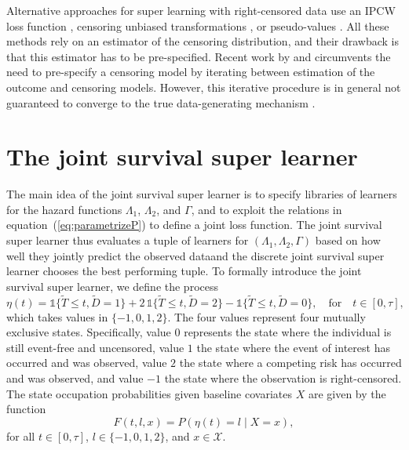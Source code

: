 \documentclass[alpha-refs]{wiley-article}
\newcommand{\1}{\mathbb{1}} %
\providecommand{\DIFaddtex}[1]{{\protect\color{blue}\uwave{#1}}} %
\providecommand{\DIFaddbegin}{} %
\providecommand{\DIFaddend}{} %
\providecommand{\DIFadd}[1]{\texorpdfstring{\DIFaddtex{#1}}{#1}} %
\begin{document}
Alternative approaches for super learning with right-censored data use
an IPCW loss function
\citep{graf1999assessment,van2003unicv,molinaro2004tree,keles2004asymptotically,hothorn2006survival,gerds2006consistent,gonzalez2021stacked},
censoring unbiased transformations
\citep{fan1996local,steingrimsson2019censoring}, or pseudo-values
\citep{andersen2003generalised,mogensen2013random,sachs2019ensemble}.
All these methods rely on an estimator of the censoring distribution,
and their drawback is that this estimator has to be pre-specified.
Recent work by \cite{han2021inverse} and \cite{westling2021inference}
circumvents the need to pre-specify a censoring model by iterating
between estimation of the outcome and censoring models. However, this
iterative procedure is in general not guaranteed to converge to the
true data-generating mechanism
\citep[][Appendix~A.4]{munch2024thesis}.


\section{The joint survival super learner}
\label{sec:joint-survival-super-learner}

The main idea of the joint survival super learner is to specify
libraries of learners for the hazard functions \( \Lambda_1 \), \(
\Lambda_2 \), and \( \Gamma \), and to exploit the relations in
equation~(\ref{eq:parametrizeP}) to define a joint loss function. The
joint survival super learner thus evaluates a tuple of learners for \(
(\Lambda_1, \Lambda_2, \Gamma) \) based on how well they jointly
predict the observed data\DIFaddbegin \DIFadd{, }\DIFaddend and the discrete joint survival super
learner chooses the best performing tuple. To formally introduce the
joint survival super learner, we define the process
\begin{equation*}
  \eta(t) = \1\{\tilde{T} \leq t, \tilde D=1\} + 2\,\1\{\tilde{T} \leq t, \tilde
  D=2\} - \1\{\tilde{T} \leq t, \tilde D=0\},
  \quad \text{for} \quad t \in [0, \tau],
\end{equation*}
which takes values in \( \{-1,0,1,2\}\). The four values represent
four mutually exclusive states. Specifically, value \( 0 \) represents
the state where the individual is still event-free and uncensored,
value \( 1\) the state where the event of interest has occurred and
was observed, value \( 2\) the state where a competing risk has
occurred and was observed, and value \( -1\) the state where the
observation is right-censored. The state occupation probabilities
given baseline covariates \( X \) are given by the function
\begin{equation}
  \label{eq:F-def}
  F(t, l, x) = P(\eta(t) = l \mid X=x),
\end{equation}
for all \( t \in [0,\tau] \), \( l \in \{-1,0,1,2\} \), and
\( x \in \mathcal{X} \).
\end{document}
